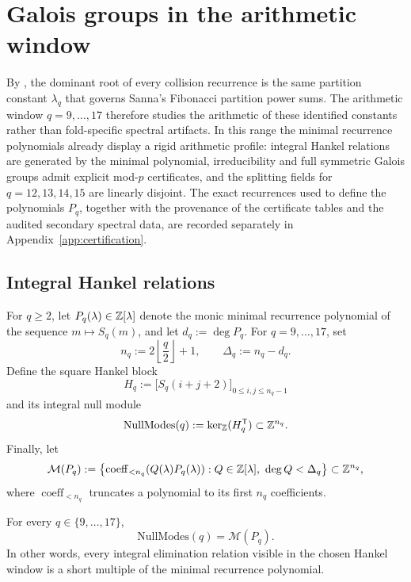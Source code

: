 \section{Galois groups in the arithmetic window}
\label{sec:chebotarev}

By , the dominant root of every collision recurrence is
the same partition constant \(\lambda_q\) that governs Sanna's Fibonacci
partition power sums.  The arithmetic window \(q=9,\dots,17\) therefore studies
the arithmetic of these identified constants rather than fold-specific spectral
artifacts.  In this range the minimal recurrence polynomials already display a
rigid arithmetic profile: integral Hankel relations are generated by the
minimal polynomial, irreducibility and full symmetric Galois groups admit
explicit mod-\(p\) certificates, and the splitting fields for
\(q=12,13,14,15\) are linearly disjoint.  The exact recurrences used to define
the polynomials \(P_q\), together with the provenance of the certificate
tables and the audited secondary spectral data, are recorded separately in
Appendix~\ref{app:certification}. 

\subsection{Integral Hankel relations}

\begin{definition}
\label{def:resonance-polynomials}
For \(q\ge 2\), let \(P_q(\lambda)\in\mathbb{Z}[\lambda]\) denote the monic minimal
recurrence polynomial of the sequence \(m\mapsto S_q(m)\), and let
\(d_q:=\deg P_q\).  For \(q=9,\dots,17\), set
\[
  n_q:=2\left\lfloor\frac{q}{2}\right\rfloor+1,
  \qquad
  \Delta_q:=n_q-d_q.
\]
Define the square Hankel block
\[
  H_q:=\bigl[S_q(i+j+2)\bigr]_{0\le i,j\le n_q-1}
\]
and its integral null module
\[
  \mathrm{NullModes}(q):=\ker_{\mathbb{Z}}(H_q^{\mathsf T})\subset \mathbb{Z}^{n_q}.
\]
Finally, let
\[
  \mathcal M(P_q):=
  \bigl\{\operatorname{coeff}_{<n_q}(Q(\lambda)P_q(\lambda)):
  Q\in\mathbb{Z}[\lambda],\ \deg Q<\Delta_q\bigr\}\subset\mathbb{Z}^{n_q},
\]
where \(\operatorname{coeff}_{<n_q}\) truncates a polynomial to its first
\(n_q\) coefficients.
\end{definition}

\begin{theorem}
\label{thm:principalization}
For every \(q\in\{9,\dots,17\}\),
\[
  \mathrm{NullModes}(q)=\mathcal M(P_q).
\]
In other words, every integral elimination relation visible in the chosen
Hankel window is a short multiple of the minimal recurrence polynomial.
\end{theorem}

